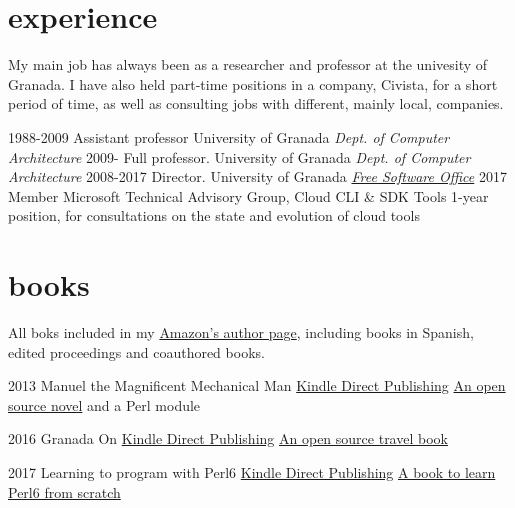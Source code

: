 \documentclass[]{friggeri-jj-cv}
\begin{document}
\section{experience}

My main job has always been as a researcher and professor at the
univesity of Granada. I have also held part-time positions in a
company, Civista, for a short period of time, as well as consulting
jobs with different, mainly local, companies.

\begin{entrylist}
  \entry
    {1988-2009}
    {Assistant professor}
    {University of Granada}
    {\emph{Dept. of Computer Architecture}}
  \entry
    {2009-}
    {Full professor.}
    {University of Granada}
    {\emph{Dept. of Computer Architecture}}
    \entry
    {2008-2017}
    {Director.}
    {University of Granada}
    {\href{http://osl.ugr.es}{\emph{Free Software Office}}}
    \entry
    {2017}
    {Member}
    {Microsoft Technical Advisory Group, Cloud CLI \& SDK Tools}
    {1-year position, for consultations on the state and evolution of cloud tools}
\end{entrylist}

\section{books}

All boks included in my
\href{https://amazon.com/author/jjmerelo}{Amazon's author page},
including books in Spanish, edited proceedings and coauthored books.

\begin{entrylist}
  \entry
    {2013}
    {Manuel the Magnificent Mechanical Man}
    {\href{http://www.amazon.com/dp/B00ED084BK/}{Kindle Direct Publishing}}
    {\href{http://jj.github.io/hoborg}{An open source novel} and a
      Perl module}
  \end{entrylist}
  
  \begin{entrylist}
  \entry
    {2016}
    {Granada On}
    {\href{https://www.amazon.com/Granada-Beaten-Track-explorations-Andalusia/dp/1523257083}{Kindle Direct Publishing}}
    {\href{http://github.com/JJ/granada-off}{An open source travel book}}
  \end{entrylist}

  \begin{entrylist}
  \entry
    {2017}
    {Learning to program with Perl6}
    {\href{https://www.amazon.com/Learning-program-Perl-Getting-programming/dp/1521795789/ref=sr_1_1?ie=UTF8&qid=1518685809&sr=8-1}{Kindle Direct Publishing}}
    {\href{http://github.com/JJ/perl6em}{A book to learn Perl6 from scratch}}
  \end{entrylist}
\end{document}
